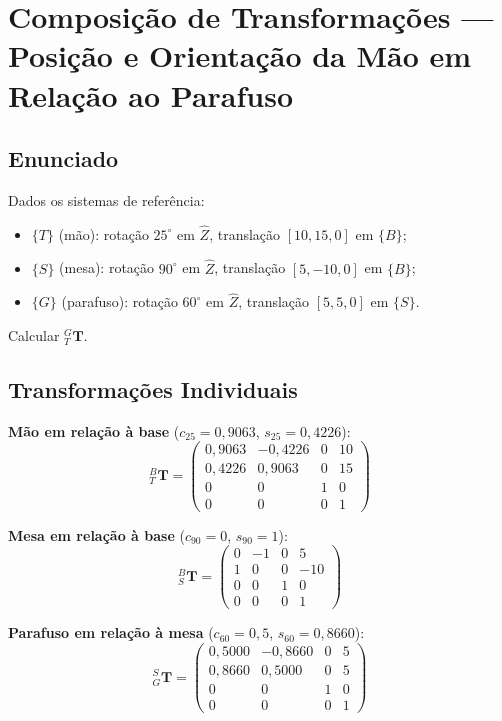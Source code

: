 \documentclass[12pt,a4paper]{article}
\newcommand{\Trans}[2]{{}^{#1}_{#2}\!\mathbf{T}}
\newcommand{\degr}{^{\circ}}
\begin{document}
\newpage

\section{Composição de Transformações --- Posição e Orientação da Mão em Relação ao Parafuso}

\subsection*{Enunciado}
Dados os sistemas de referência:
\begin{itemize}
  \item $\{T\}$ (mão): rotação $25\degr$ em $\hat{Z}$, translação $[10, 15, 0]$ em $\{B\}$;
  \item $\{S\}$ (mesa): rotação $90\degr$ em $\hat{Z}$, translação $[5, -10, 0]$ em $\{B\}$;
  \item $\{G\}$ (parafuso): rotação $60\degr$ em $\hat{Z}$, translação $[5, 5, 0]$ em $\{S\}$.
\end{itemize}
Calcular ${}^{G}_{T}\mathbf{T}$.

\subsection{Transformações Individuais}

\textbf{Mão em relação à base} ($c_{25}=0{,}9063$, $s_{25}=0{,}4226$):
\[
\Trans{B}{T} =
\begin{pmatrix}
  0{,}9063 & -0{,}4226 & 0 & 10 \\
  0{,}4226 &  0{,}9063 & 0 & 15 \\
  0        &  0        & 1 &  0 \\
  0        &  0        & 0 &  1
\end{pmatrix}
\]

\textbf{Mesa em relação à base} ($c_{90}=0$, $s_{90}=1$):
\[
\Trans{B}{S} =
\begin{pmatrix}
  0 & -1 & 0 &   5 \\
  1 &  0 & 0 & -10 \\
  0 &  0 & 1 &   0 \\
  0 &  0 & 0 &   1
\end{pmatrix}
\]

\textbf{Parafuso em relação à mesa} ($c_{60}=0{,}5$, $s_{60}=0{,}8660$):
\[
\Trans{S}{G} =
\begin{pmatrix}
  0{,}5000 & -0{,}8660 & 0 & 5 \\
  0{,}8660 &  0{,}5000 & 0 & 5 \\
  0        &  0        & 1 & 0 \\
  0        &  0        & 0 & 1
\end{pmatrix}
\]
\end{document}
